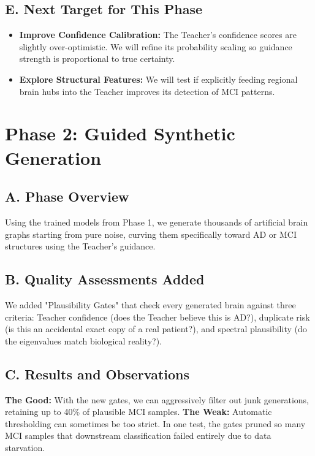 \documentclass[11pt, a4paper]{article}
\begin{document}
\subsection{E. Next Target for This Phase}
\begin{itemize}[leftmargin=1.5em]
  \item \textbf{Improve Confidence Calibration:} The Teacher's confidence scores are slightly over-optimistic. We will refine its probability scaling so guidance strength is proportional to true certainty.
  \item \textbf{Explore Structural Features:} We will test if explicitly feeding regional brain hubs into the Teacher improves its detection of MCI patterns.
\end{itemize}

\section{Phase 2: Guided Synthetic Generation}

\subsection{A. Phase Overview}
Using the trained models from Phase 1, we generate thousands of artificial brain graphs starting from pure noise, curving them specifically toward AD or MCI structures using the Teacher's guidance.

\subsection{B. Quality Assessments Added}
We added "Plausibility Gates" that check every generated brain against three criteria: Teacher confidence (does the Teacher believe this is AD?), duplicate risk (is this an accidental exact copy of a real patient?), and spectral plausibility (do the eigenvalues match biological reality?).

\subsection{C. Results and Observations}
\textbf{The Good:} With the new gates, we can aggressively filter out junk generations, retaining up to 40\% of plausible MCI samples.
\textbf{The Weak:} Automatic thresholding can sometimes be too strict. In one test, the gates pruned so many MCI samples that downstream classification failed entirely due to data starvation.
\end{document}
